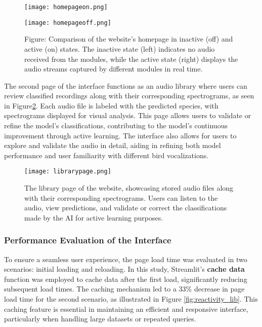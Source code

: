 \begin{figure}[h!]
    \centering
    \begin{minipage}{.5\textwidth}
        \centering
        \texttt{[image: homepageon.png]}
    \end{minipage}%
    \begin{minipage}{.5\textwidth}
        \centering
        \texttt{[image: homepageoff.png]}
    \end{minipage}
    \caption{Figure: Comparison of the website’s homepage in inactive (off) and active (on) states. The inactive state (left) indicates no audio received from the modules, while the active state (right) displays the audio streams captured by different modules in real time.}
    \label{fig:website}
\end{figure}


The second page of the interface functions as an audio library where users can review classified recordings along with their corresponding spectrograms, as seen in Figure\ref{fig:website_lib}. Each audio file is labeled with the predicted species, with spectrograms displayed for visual analysis. This page allows users to validate or refine the model’s classifications, contributing to the model’s continuous improvement through active learning. The interface also allows for users to explore and validate the audio in detail, aiding in refining both model performance and user familiarity with different bird vocalizations.

\begin{figure}[h]
    \centering
    \texttt{[image: librarypage.png]}
    \caption{The library page of the website, showcasing stored audio files along with their corresponding spectrograms. Users can listen to the audio, view predictions, and validate or correct the classifications made by the AI for active learning purposes.}
    \vspace{0.1cm}
    \label{fig:website_lib}
\end{figure}

\subsubsection{Performance Evaluation of the Interface}
To ensure a seamless user experience, the page load time was evaluated in two scenarios: initial loading and reloading. In this study, Streamlit’s \textbf{cache data} function was employed to cache data after the first load, significantly reducing subsequent load times. The caching mechanism led to a 33\% decrease in page load time for the second scenario, as illustrated in Figure \ref{fig:reactivity_lib}. This caching feature is essential in maintaining an efficient and responsive interface, particularly when handling large datasets or repeated queries.

